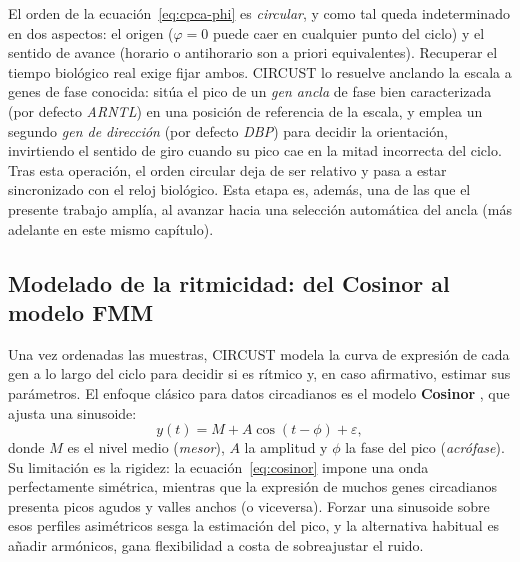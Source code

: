 \documentclass[12pt, a4paper]{report}
\begin{document}
El orden de la ecuación~\eqref{eq:cpca-phi} es \emph{circular}, y como tal queda indeterminado en dos aspectos: el origen ($\varphi=0$ puede caer en cualquier punto del ciclo) y el sentido de avance (horario o antihorario son a priori equivalentes). Recuperar el tiempo biológico real exige fijar ambos. CIRCUST lo resuelve anclando la escala a genes de fase conocida: sitúa el pico de un \emph{gen ancla} de fase bien caracterizada (por defecto \textit{ARNTL}) en una posición de referencia de la escala, y emplea un segundo \emph{gen de dirección} (por defecto \textit{DBP}) para decidir la orientación, invirtiendo el sentido de giro cuando su pico cae en la mitad incorrecta del ciclo. Tras esta operación, el orden circular deja de ser relativo y pasa a estar sincronizado con el reloj biológico. Esta etapa es, además, una de las que el presente trabajo amplía, al avanzar hacia una selección automática del ancla (más adelante en este mismo capítulo).

\subsection{Modelado de la ritmicidad: del Cosinor al modelo FMM}
\label{subsec:fmm-intro}

Una vez ordenadas las muestras, CIRCUST modela la curva de expresión de cada gen a lo largo del ciclo para decidir si es rítmico y, en caso afirmativo, estimar sus parámetros. El enfoque clásico para datos circadianos es el modelo \textbf{Cosinor} \cite{cosinor}, que ajusta una sinusoide:
\begin{equation}
    y(t) = M + A\cos(t - \phi) + \varepsilon,
    \label{eq:cosinor}
\end{equation}
donde $M$ es el nivel medio (\textit{mesor}), $A$ la amplitud y $\phi$ la fase del pico (\textit{acrófase}). Su limitación es la rigidez: la ecuación~\eqref{eq:cosinor} impone una onda perfectamente simétrica, mientras que la expresión de muchos genes circadianos presenta picos agudos y valles anchos (o viceversa). Forzar una sinusoide sobre esos perfiles asimétricos sesga la estimación del pico, y la alternativa habitual es añadir armónicos, gana flexibilidad a costa de sobreajustar el ruido.
\end{document}
